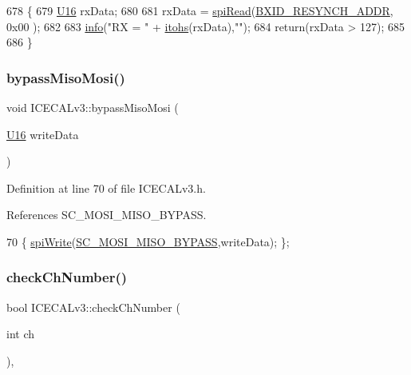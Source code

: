 \begin{DoxyCode}
678 \{
679     \hyperlink{ICECALv3_8h_adf928e51a60dba0df29d615401cc55a8}{U16} rxData;
680 
681     rxData = \hyperlink{classICECALv3_aced41ce20a0853d6248b8df88412e57a}{spiRead}(\hyperlink{ICECALv3_8h_a57a201af9e55ffd847b551bff2dc71ce}{BXID\_RESYNCH\_ADDR}, 0x00 );
682 
683     \hyperlink{classObject_a644fd329ea4cb85f54fa6846484b84a8}{info}(\textcolor{stringliteral}{"RX = "} + \hyperlink{classICECALv3_a04b02e583f191bfce34d05132cd23834}{itohs}(rxData),\textcolor{stringliteral}{""});
684     \textcolor{keywordflow}{return}(rxData > 127);
685 
686 \}
\end{DoxyCode}
\mbox{\label{classICECALv3_a5ce36881aa89fedf7c37e03620acca6e}} 
\subsubsection{\texorpdfstring{bypass\+Miso\+Mosi()}{bypassMisoMosi()}}
{\footnotesize\ttfamily void I\+C\+E\+C\+A\+Lv3\+::bypass\+Miso\+Mosi (\begin{DoxyParamCaption}\item[{\hyperlink{ICECALv3_8h_adf928e51a60dba0df29d615401cc55a8}{U16}}]{write\+Data }\end{DoxyParamCaption})\hspace{0.3cm}{\ttfamily [inline]}}



Definition at line 70 of file I\+C\+E\+C\+A\+Lv3.\+h.



References S\+C\+\_\+\+M\+O\+S\+I\+\_\+\+M\+I\+S\+O\+\_\+\+B\+Y\+P\+A\+SS.


\begin{DoxyCode}
70 \{       \hyperlink{classICECALv3_aef00f02801dea4bda2093c930501dcdd}{spiWrite}(\hyperlink{ICECALv3_8h_a2870f5a3cad23b2b4e7f16faefe8ef2e}{SC\_MOSI\_MISO\_BYPASS},writeData); \};
\end{DoxyCode}
\mbox{\label{classICECALv3_a8753a74558f988b346a3fe350c5bbad4}} 
\subsubsection{\texorpdfstring{check\+Ch\+Number()}{checkChNumber()}}
{\footnotesize\ttfamily bool I\+C\+E\+C\+A\+Lv3\+::check\+Ch\+Number (\begin{DoxyParamCaption}\item[{int}]{ch }\end{DoxyParamCaption})\hspace{0.3cm}{\ttfamily [inline]}, {\ttfamily [private]}}



